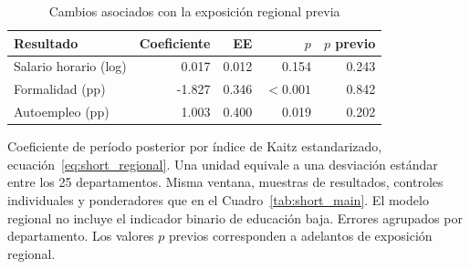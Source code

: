 \begin{table}[!htbp]\centering
\caption{Cambios asociados con la exposición regional previa}\label{tab:short_regional}
\begin{threeparttable}\small
\setlength{\tabcolsep}{4pt}
\begin{tabular}{lrrrr}
\toprule
Resultado & Coeficiente & EE & $p$ & $p$ previo \\
\midrule
Salario horario (log) & 0.017 & 0.012 & 0.154 & 0.243 \\
Formalidad (pp) & -1.827 & 0.346 & $<0.001$ & 0.842 \\
Autoempleo (pp) & 1.003 & 0.400 & 0.019 & 0.202 \\
\bottomrule
\end{tabular}
\begin{tablenotes}\footnotesize
\item Coeficiente de período posterior por índice de Kaitz estandarizado, ecuación~\eqref{eq:short_regional}. Una unidad equivale a una desviación estándar entre los 25 departamentos. Misma ventana, muestras de resultados, controles individuales y ponderadores que en el Cuadro~\ref{tab:short_main}. El modelo regional no incluye el indicador binario de educación baja. Errores agrupados por departamento. Los valores $p$ previos corresponden a adelantos de exposición regional.
\end{tablenotes}
\end{threeparttable}\end{table}
